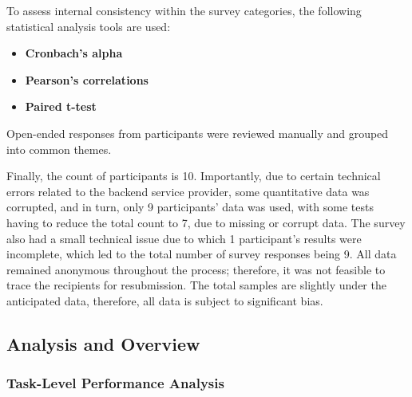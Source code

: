 To assess internal consistency within the survey categories, the following statistical analysis tools are used:
\begin{itemize}
        \item \textbf{Cronbach’s alpha}
        \item \textbf{Pearson's correlations}
        \item \textbf{Paired t-test}
\end{itemize}

Open-ended responses from participants were reviewed manually and grouped into common themes.

Finally, the count of participants is 10. 
Importantly, due to certain technical errors related to the backend service provider, some quantitative data was corrupted, and in turn, only 9 participants' data was used, with some tests having to reduce the total count to 7, due to missing or corrupt data.
The survey also had a small technical issue due to which 1 participant's results were incomplete, which led to the total number of survey responses being 9. 
All data remained anonymous throughout the process; therefore, it was not feasible to trace the recipients for resubmission.
The total samples are slightly under the anticipated data, therefore, all data is subject to significant bias.

\subsection{Analysis and Overview}

\subsubsection{Task-Level Performance Analysis}

